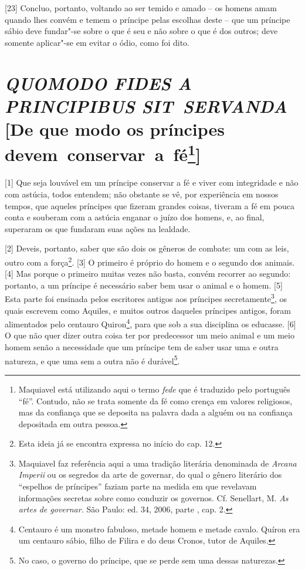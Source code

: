 {[}23{]} Concluo, portanto, voltando ao ser temido e amado -- os homens
amam quando lhes convém e temem o príncipe pelas escolhas deste -- que
um príncipe sábio deve fundar"-se sobre o que é seu e não sobre o que é
dos outros; deve somente aplicar"-se em evitar o ódio, como foi dito.

\quebra\section{\emph{QUOMODO FIDES A PRINCIPIBUS SIT~SERVANDA}\break
{[}De que modo os príncipes devem~conservar~a~fé\protect\footnote{\uppercase{M}aquiavel está
  utilizando aqui o termo \emph{fede} que é traduzido pelo português
  ``fé''. Contudo, não se trata somente da fé como crença em valores
  religiosos, mas da confiança que se deposita na palavra dada a alguém
  ou na confiança depositada em outra pessoa.}{]}}

{[}1{]} Que seja louvável em um príncipe conservar a fé e viver com
integridade e não com astúcia, todos entendem; não obstante se vê, por
experiência em nossos tempos, que aqueles príncipes que fizeram grandes
coisas, tiveram a fé em pouca conta e souberam com a astúcia enganar o
juízo dos homens, e, ao final, superaram os que fundaram suas ações na
lealdade.

{[}2{]} Deveis, portanto, saber que são dois os gêneros de combate: um
com as leis, outro com a força\footnote{Esta ideia já se encontra
  expressa no início do cap. 12.}. {[}3{]} O primeiro é próprio do homem
e o segundo dos animais. {[}4{]} Mas porque o primeiro muitas vezes não
basta, convém recorrer ao segundo: portanto, a um príncipe é necessário
saber bem usar o animal e o homem. {[}5{]} Esta parte foi ensinada pelos
escritores antigos aos príncipes secretamente\footnote{Maquiavel faz
  referência aqui a uma tradição literária denominada de \emph{Arcana
  Imperii} ou os segredos da arte de governar, do qual o gênero
  literário dos ``espelhos de príncipes'' faziam parte na medida em que
  revelavam informações secretas sobre como conduzir os governos. Cf.
  Senellart, M. \emph{As artes de governar.} São Paulo: ed. 34, 2006,
  parte , cap. 2.}, os quais escrevem como Aquiles, e muitos outros
daqueles príncipes antigos, foram alimentados pelo centauro
Quiron\footnote{Centauro é um monstro fabuloso, metade homem e metade
  cavalo. Quíron era um centauro sábio, filho de Filira e do deus
  Cronos, tutor de Aquiles.}, para que sob a sua disciplina os educasse.
{[}6{]} O que não quer dizer outra coisa ter por predecessor um meio
animal e um meio homem senão a necessidade que um príncipe tem de saber
usar uma e outra natureza, e que uma sem a outra não é durável\footnote{No
  caso, o governo do príncipe, que se perde sem uma dessas naturezas.}.

